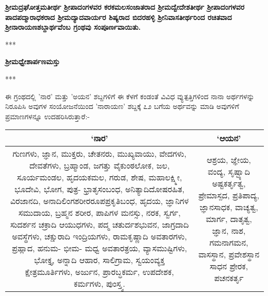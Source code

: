 \begin{center}
\textbf{ಶ‍್ರೀಮದ್ರಘೋತ್ತಮತೀರ್ಥ ಶ‍್ರೀಪಾದಂಗಳವರ ಕರಕಮಲಸಂಜಾತರಾದ ಶ‍್ರೀಮದ್ವೇದೇಶತೀರ್ಥ ಶ‍್ರೀಪಾದಂಗಳವರ ಪಾದಪದ್ಮಾರಾಧಕರಾದ ಶ‍್ರೀಮದ್ಯಾದವಾರ್ಯರ ಶಿಷ್ಯರಾದ ಬಿದರಹಳ್ಳಿ ಶ‍್ರೀನಿವಾಸತೀರ್ಥರಿಂದ ರಚಿತವಾದ ಶ‍್ರೀನಾರಾಯಣಶಬ್ದಾರ್ಥವೆಂಬ ಗ್ರಂಥವು ಸಂಪೂರ್ಣವಾಯಿತು.}
\end{center}

\begin{center}
***
\end{center}

\begin{center}
\textbf{ಶ‍್ರೀಮಧ್ವೇಶಾರ್ಪಣಮಸ್ತು}
\end{center}

\begin{center}
***
\end{center}

ಈ ಗ್ರಂಥದಲ್ಲಿ 'ನಾರ' ಮತ್ತು 'ಅಯನ' ಶಬ್ದಗಳಿಗೆ ಈ ಕೆಳಗೆ ಕಂಡಂತೆ ವಿವಿಧ ವ್ಯುತ್ಪತ್ತಿಗಳಿಂದ ನಾನಾ ಅರ್ಥಗಳನ್ನು ನಿರೂಪಿಸಿ ಅವುಗಳ ಸಂಯೋಜನೆಯಿಂದ 'ನಾರಾಯಣ' ಶಬ್ದಕ್ಕೆ ೭೨ ಬಗೆಯ ಅರ್ಥವನ್ನು ಮಾಡಿ ಅವುಗಳಿಗೆ ಪ್ರಮಾಣಗಳನ್ನೂ ಉದಹರಿಸಿರುತ್ತಾರೆ:-

\begin{tabular}{|c|c|}
\hline
`ನಾರ' & `ಆಯನ' \\
\hline
ಗುಣಗಳು, ಜ್ಞಾನ, ಮುಕ್ತರು, ಚೇತನರು, ಮುಖ್ಯವಾಯು, ವೇದಗಳು, ದೇವತೆಗಳು, ಬ್ರಹ್ಮಾಂಡ, ಜಗತ್ತು ವೈಕುಂಠಲೋಕ, ಜಲ, ಸೂರ್ಯಮಂಡಲ, ಹೃದಯಕಮಲ, ಗರುಡ, ಶೇಷ, ಮಹಾಲಕ್ಷ್ಮೀ, ಭೂದೇವಿ, ಭೋಗ, ಪುತ್ರ- ಭ್ರಾತೃಸಂಬಂಧ, ಅನಿತ್ಯಾದಿದೋಷರಹಿತ, ವಿರಜಾನದಿ, ಅನಾದಿಲಿಂಗಶರೀರರೂಪಪ್ರಕೃತಿಬಂಧ, ಹೃದಯ, ಜ್ಞಾನಿಗಳ ಸಮುದಾಯ,  ಬ್ರಹ್ಮನ ಶರೀರ, ಪಾಪಿಗಳ ಮನಸ್ಸು, ನರಕ, ಸ್ವರ್ಗ, ಸುದರ್ಶನ ಚಕ್ರಾದಿ ಆಯುಧಗಳು, ಪದ್ಮ ಚತುರ್ದಶಭುವನ, ಜಾಗ್ರದಾದಿ ಅವಸ್ಥೆಗಳು, ಚಕ್ಷುರಾದಿ ಇಂದ್ರಿಯಗಳು, ರಾಮಕೃಷ್ಣಾದಿ ಅವತಾರಗಳು, ಪ್ರಹ್ಲಾದ, ಹನುಮ- ಭೀಮ- ಮಧ್ವ ಅವತಾರತ್ರಯ, ವ್ಯಾಸಮುಷ್ಟಿಗಳು, ಭೋಕ್ತೃ, ಅನ್ನಾದಿ ಆಹಾರ, ಸಾಲಿಗ್ರಾಮ, ಸ್ವಯಂವ್ಯಕ್ತ ಕ್ಷೇತ್ರಮೂರ್ತಿಗಳು, ಅರ್ಜುನ, ಪ್ರಾರಬ್ಧಕರ್ಮ, ಉಪದೇಶಕ, ಕರ್ಮಗಳು, ಪುಂಸ್ತ್ವ. & ಆಶ್ರಯ, ಜ್ಞೇಯ,  ವಂದ್ಯ, ಸೃಷ್ಟ್ಯಾದಿ ಅಷ್ಟಕರ್ತೃತ್ವ, ಪ್ರೇಮಾಸ್ಪದ,  ಪ್ರತಿಪಾದ್ಯ, ಜ್ಞಾನಸಾಧಕ,  ವಾಚ್ಯತ್ವ, ಮಾರ್ಗ, ದಾತೃತ್ವ, ಜ್ಞಾನ, ನಾಶ,  ಗಮನಾಗಮನ,  ವಾಸಸ್ಥಾನ, ಪ್ರವೇಶಸ್ಥಾನ  ಸಾಧನ ಪ್ರೇರಕ, ಪಚನಕರ್ತೃ \\
\hline
\end{tabular}


